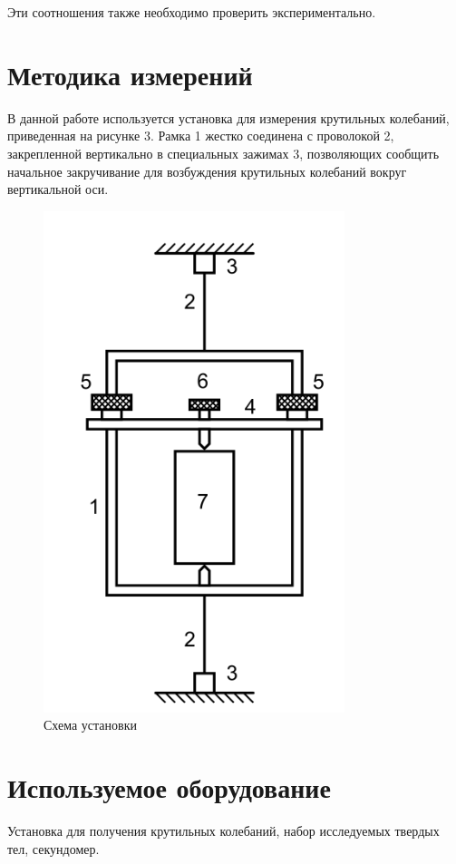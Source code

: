 \documentclass[a4paper, 12pt]{article}
\begin{document}
	Эти соотношения также необходимо проверить экспериментально.

 	\section{Методика измерений}
	В данной работе используется установка для измерения крутильных колебаний, приведенная
	на рисунке 3. Рамка 1 жестко соединена с проволокой 2, закрепленной вертикально в специальных
	зажимах 3, позволяющих сообщить начальное закручивание для возбуждения крутильных колебаний
	вокруг вертикальной оси.
	\begin{figure}[H]
		\centering
		\includegraphics[scale = 0.5]{pictures/stand.png}
		\caption{Схема установки}
	\end{figure}

%
%
	\section{Используемое оборудование}
	Установка для получения крутильных колебаний, набор исследуемых твердых тел, секундомер.

%
%
\end{document}
